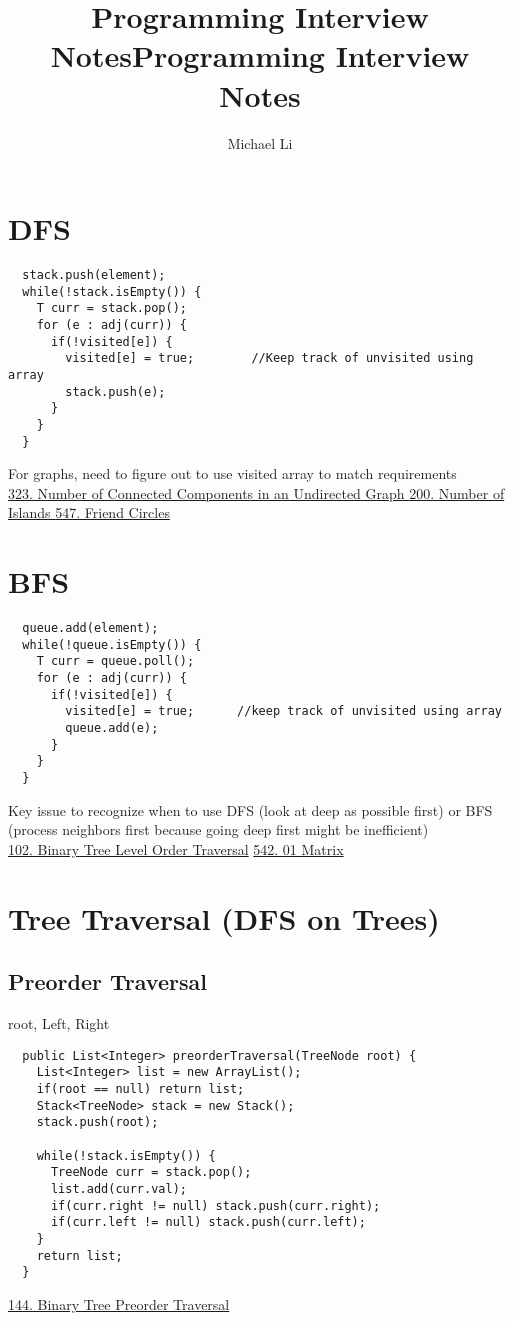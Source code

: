 \documentclass{article}
\title{Programming Interview Notes}
\date{}
\begin{document}
 
  \author{Michael Li}
  \title{Programming Interview Notes}
  \maketitle
  \tableofcontents
  \newpage
  \section{DFS}
  \begin{lstlisting}
  stack.push(element);
  while(!stack.isEmpty()) {
    T curr = stack.pop();
    for (e : adj(curr)) {
      if(!visited[e]) {
        visited[e] = true;        //Keep track of unvisited using array
        stack.push(e); 
      }
    }
  }
  \end{lstlisting}
  For graphs, need to figure out to use visited array to match requirements\\
  \href{https://leetcode.com/problems/number-of-connected-components-in-an-undirected-graph/}{323. Number of Connected Components in an Undirected Graph
} \quad \href{https://leetcode.com/problems/number-of-islands/}{200. Number of Islands
} \quad \href{https://leetcode.com/problems/friend-circles/description/}{547. Friend Circles
}
  \section{BFS}
  \begin{lstlisting}
  queue.add(element);
  while(!queue.isEmpty()) {
    T curr = queue.poll();
    for (e : adj(curr)) {
      if(!visited[e]) {
        visited[e] = true;      //keep track of unvisited using array
        queue.add(e);
      }
    }
  }
  \end{lstlisting}
  Key issue to recognize when to use DFS (look at deep as possible first) or BFS (process neighbors first because going deep first might be inefficient)\\
  \href{https://leetcode.com/problems/binary-tree-level-order-traversal/}{102. Binary Tree Level Order Traversal} \quad \href{https://leetcode.com/problems/01-matrix/}{542. 01 Matrix}
  \section{Tree Traversal (DFS on Trees)}
  \subsection{Preorder Traversal}
  root, Left, Right
  \begin{lstlisting}
  public List<Integer> preorderTraversal(TreeNode root) {
    List<Integer> list = new ArrayList();
    if(root == null) return list;
    Stack<TreeNode> stack = new Stack();
    stack.push(root);
    
    while(!stack.isEmpty()) {
      TreeNode curr = stack.pop();
      list.add(curr.val);
      if(curr.right != null) stack.push(curr.right);
      if(curr.left != null) stack.push(curr.left);
    }
    return list;
  }
  \end{lstlisting}
  \href{https://leetcode.com/problems/binary-tree-preorder-traversal/}{144. Binary Tree Preorder Traversal}
\end{document}

